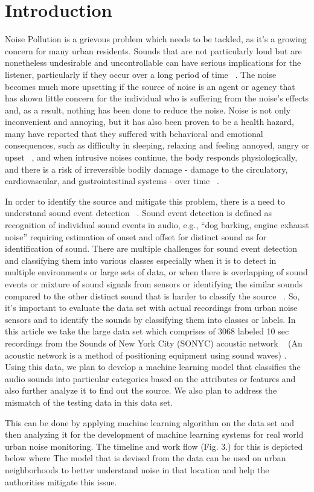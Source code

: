 \section{Introduction}
Noise Pollution is a grievous problem which needs to be tackled, as it’s a growing concern for many urban residents. Sounds that are not particularly loud but are nonetheless undesirable and uncontrollable can have serious implications for the listener, particularly if they occur over a long period of time ~\cite{3}. The noise becomes much more upsetting if the source of noise is an agent or agency that has shown little concern for the individual who is suffering from the noise's effects and, as a result, nothing has been done to reduce the noise. Noise is not only inconvenient and annoying, but it has also been proven to be a health hazard, many have reported that they suffered with behavioral and emotional consequences, such as difficulty in sleeping, relaxing and feeling annoyed, angry or upset ~\cite{2}, and when intrusive noises continue, the body responds physiologically, and there is a risk of irreversible bodily damage - damage to the circulatory, cardiovascular, and gastrointestinal systems - over time ~\cite{1}.


In order to identify the source and mitigate this problem, there is a need to understand sound event detection ~\cite{6}. Sound event detection is defined as recognition of individual sound events in audio, e.g., “dog barking, engine exhaust noise” requiring estimation of onset and offset for distinct sound as for identification of sound. There are multiple challenges for sound event detection and classifying them into various classes especially when it is to detect in multiple environments or large sets of data, or when there is overlapping of sound events or mixture of sound signals from sensors or identifying the similar sounds compared to the other distinct sound that is harder to classify the source ~\cite{8}. So, it's important to evaluate the data set with actual recordings from urban noise sensors and to identify the sounds by classifying them into classes or labels. In this article we take the large data set which comprises of 3068 labeled 10 sec recordings from the Sounds of New York City (SONYC) acoustic network ~\cite{7} (An acoustic network is a method of positioning equipment using sound waves) . Using this data, we plan to develop a machine learning model that classifies the audio sounds into particular categories based on the attributes or features and also further analyze it to find out the source. We also plan to address the mismatch of the testing data in this data set.

This can be done by applying machine learning algorithm on the data set and then analyzing it for the development of machine learning systems for real world urban noise monitoring. The timeline and work flow (Fig. 3.) for this is depicted below where The model that is devised from the data can be used on urban neighborhoods to better understand noise in that location and help the authorities mitigate this issue.
